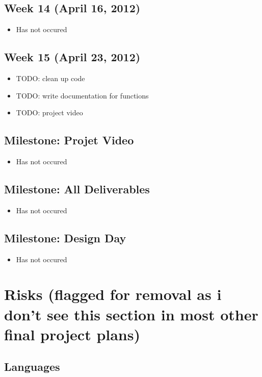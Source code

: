\documentclass[11pt,a4paper,oneside]{article}
\begin{document}
\subsection{Week 14 (April 16, 2012)}
\begin{itemize}
\item Has not occured
\end{itemize}

\subsection{Week 15 (April 23, 2012)}
\begin{itemize}
\item TODO: clean up code
\item TODO: write documentation for functions
\item TODO: project video
\end{itemize}

\subsection{Milestone: Projet Video}
\begin{itemize}
\item Has not occured
\end{itemize}

\subsection{Milestone: All Deliverables}
\begin{itemize}
\item Has not occured
\end{itemize}

\subsection{Milestone: Design Day}
\begin{itemize}
\item Has not occured
\end{itemize}




\section{Risks (flagged for removal as i don't see this section in most other final project plans)}

\subsection{Languages}
\end{document}

